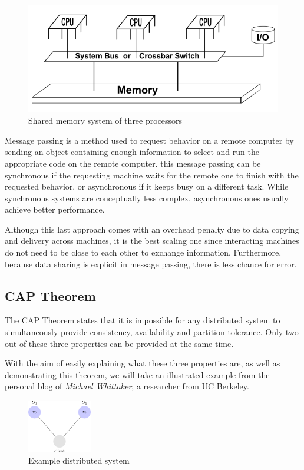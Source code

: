 \begin{figure}[h!]
\centering
    \includegraphics[scale=0.6]{assets/images/shared_memory.png}
    \caption{Shared memory system of three processors}
    \label{fig:shared_memory}
\end{figure}

\newpage
Message passing is a method used to request behavior on a remote computer by sending an object containing enough information to select and run the appropriate code on the remote computer. this message passing can be synchronous if the requesting machine waits for the remote one to finish with the requested behavior, or asynchronous if it keeps busy on a different task. While synchronous systems are conceptually less complex, asynchronous ones usually achieve better performance.

Although this last approach comes with an overhead penalty due to data copying and delivery across machines, it is the best scaling one since interacting machines do not need to be close to each other to exchange information. Furthermore, because data sharing is explicit in message passing, there is less chance for error. 

\subsection{CAP Theorem}
The CAP Theorem states that it is impossible for any distributed system to simultaneously provide consistency, availability and partition tolerance. Only two out of these three properties can be provided at the same time\cite{wikipedia_cap}.

With the aim of easily explaining what these three properties are, as well as demonstrating this theorem, we will take an illustrated example\cite{cap-example} from the personal blog of \textit{Michael Whittaker}, a researcher from UC Berkeley.

\begin{figure}
\centering
    \includegraphics[width=0.25\textwidth]{assets/images/cap1.png}
    \caption{Example distributed system}
    \label{fig:dis-sys-1}
\end{figure}

